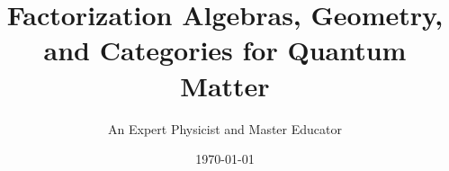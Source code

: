 \theoremstyle{remark}
\newtheorem{remark}{Remark}[chapter]

\newenvironment{solution}{%
  \par\addvspace{\topsep}%
  \noindent\textbf{Solution. }%
  \begingroup %
  \small
  \setstretch{1.0} %
}{%
  \qed\par\addvspace{\topsep}%
  \endgroup %
}

\renewenvironment{proof}[1][\proofname]{%
  \par\addvspace{\topsep}%
  \noindent\textbf{#1. }%
  \begingroup %
  \small
  \setstretch{1.0} %
}{%
  \qed\par\addvspace{\topsep}%
  \endgroup %
}


\title{Factorization Algebras, Geometry, and Categories for Quantum Matter}
\author{An Expert Physicist and Master Educator}
\date{\today}
